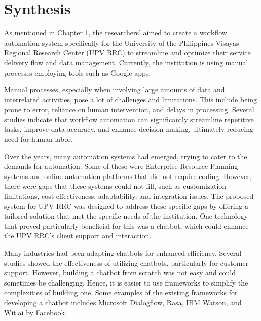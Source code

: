 \begin{table}
	
\end{table}

\section{Synthesis}

As mentioned in Chapter 1, the researchers' aimed to create a workflow automation system specifically for the University of the Philippines Visayas - Regional Research Center (UPV RRC) to streamline and optimize their service delivery flow and data management. Currently, the institution is using manual processes employing tools such as Google apps.

Manual processes, especially when involving large amounts of data and interrelated activities, pose a lot of challenges and limitations. This include being prone to error, reliance on human intervention, and delays in processing. Several studies indicate that workflow automation can significantly streamline repetitive tasks, improve data accuracy, and enhance decision-making, ultimately reducing need for human labor. 

Over the years, many automation systems had emerged, trying to cater to the demands for automation. Some of these were Enterprise Resource Planning systems and online automation platforms that did not require coding. However, there were gaps that these systems could not fill, such as customization limitations, cost-effectiveness, adaptability, and integration issues. The proposed system for UPV RRC was designed to address these specific gaps by offering a tailored solution that met the specific needs of the institution. One technology that proved particularly beneficial for this was a chatbot, which could enhance the UPV RRC’s client support and interaction.

Many industries had been adapting chatbots for enhanced efficiency. Several studies showed the effectiveness of utilizing chatbots, particularly for customer support. However, building a chatbot from scratch was not easy and could sometimes be challenging. Hence, it is easier to use frameworks to simplify the complexities of building one. Some examples of the existing frameworks for developing a chatbot includes Microsoft Dialogflow, Rasa, IBM Watson, and Wit.ai by Facebook.














